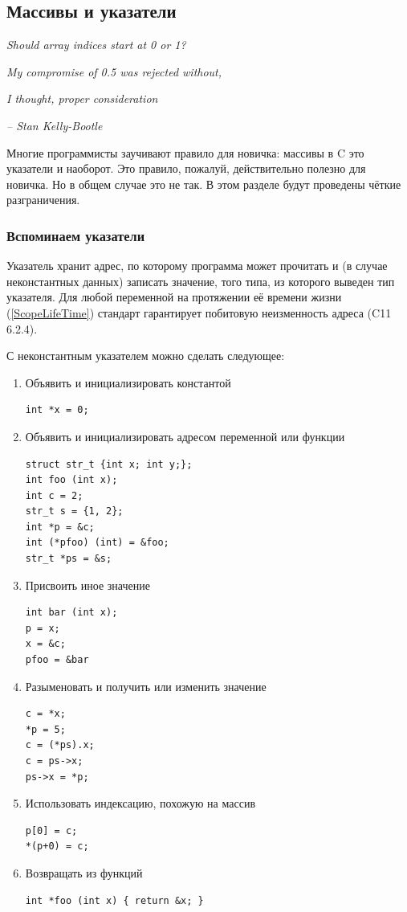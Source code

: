 \documentclass[a4paper,12pt,oneside]{article}
\begin{document}
\pagebreak
\subsection{Массивы и указатели}\label{subsec:arrpointers}

\hfill\textit{Should array indices start at 0 or 1?}

\hfill\textit{My compromise of 0.5 was rejected without,} 

\hfill\textit{I thought, proper consideration}{\vspace{0.5em}}

\hfill\textit{-- Stan Kelly-Bootle}

Многие программисты заучивают правило для новичка: массивы в C это указатели и наоборот. Это правило, пожалуй, действительно полезно для новичка. Но в общем случае это не так. В этом разделе будут проведены чёткие разграничения. 

\subsubsection{Вспоминаем указатели}

Указатель хранит адрес, по которому программа может прочитать и (в случае неконстантных данных) записать значение, того типа, из которого выведен тип указателя. Для любой переменной на протяжении её времени жизни (\ref{ScopeLifeTime}) стандарт гарантирует побитовую неизменность адреса (C11 6.2.4).

С неконстантным указателем можно сделать следующее:

\begin{enumerate}
\item Объявить и инициализировать константой
\begin{lstlisting}
int *x = 0;
\end{lstlisting}
\item Объявить и инициализировать адресом переменной или функции
\begin{lstlisting}
struct str_t {int x; int y;};
int foo (int x);
int c = 2;
str_t s = {1, 2};
int *p = &c;
int (*pfoo) (int) = &foo;
str_t *ps = &s;
\end{lstlisting}
\item Присвоить иное значение
\begin{lstlisting}
int bar (int x);
p = x;
x = &c;
pfoo = &bar
\end{lstlisting}
\item Разыменовать и получить или изменить значение
\begin{lstlisting}
c = *x;
*p = 5;
c = (*ps).x;
c = ps->x;
ps->x = *p;
\end{lstlisting}
\item Использовать индексацию, похожую на массив
\begin{lstlisting}
p[0] = c;
*(p+0) = c;
\end{lstlisting}
\item Возвращать из функций
\begin{lstlisting}
int *foo (int x) { return &x; }
\end{lstlisting}
\end{enumerate}
\end{document}
